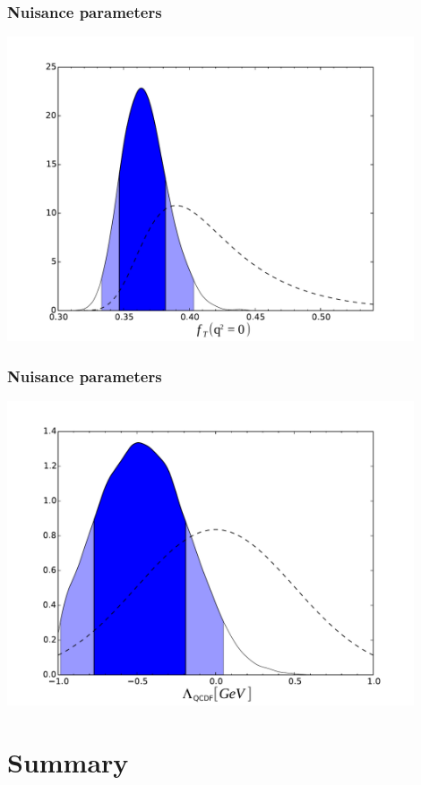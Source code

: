 \documentclass[english]{beamer}
\newcommand{\slide}[2][t]{\begin{frame}[#1] \frametitle{\insertsection} #2 \end{frame}}
\begin{document}
\slide[t]{

    \frametitle{Nuisance parameters}

    \begin{center}
        \includegraphics[width=0.9\textwidth]{figures/FF_ft0}
    \end{center}

}

\slide{

    \frametitle{Nuisance parameters}

    \begin{center}
        \includegraphics[width=0.9\textwidth]{figures/SL_large_recoil}
    \end{center}

}

\section{Summary}
\end{document}
